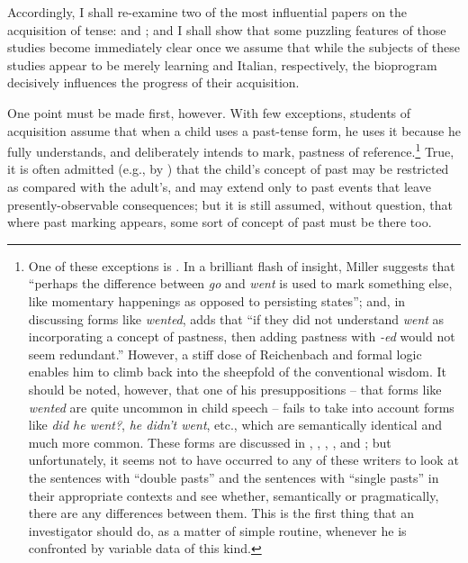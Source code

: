 \newpage Accordingly, I shall re-examine two of the most influential papers on the acquisition of tense: \citet{BrockartEtAl1973} and \citet{AntinucciEtAl1976}; and I shall show that some puzzling features of those studies become immediately clear once we assume that while the subjects of these studies appear to be merely learning  and Italian, respectively, the bioprogram decisively influences the progress of their acquisition.

One point must be made first, however. With few exceptions, students of acquisition assume that when a child uses a past-tense form, he uses it because he fully understands, and deliberately intends to mark, pastness of reference.\footnote{One of these exceptions is \citet{Miller1978}. In a brilliant flash of insight, Miller suggests that ``perhaps the difference between \textit{go} and \textit{went} is used to mark something else, like momentary happenings as opposed to persisting states''; and, in discussing forms like \textit{wented}, adds that ``if they did not understand \textit{went} as incorporating a concept of pastness, then adding pastness with \textit{-ed} would not seem redundant.'' However, a stiff dose of Reichenbach and formal logic enables him to climb back into the sheepfold of the conventional wisdom. It should be noted, however, that one of his presuppositions -- that forms like \textit{wented} are quite uncommon in child speech -- fails to take into account forms like \textit{did he went?}, \textit{he didn't went}, etc., which are semantically identical and much more common. These forms are discussed in \citet{Hurford1975}, \citet{Kuczaj1976}, \citet{Fay1978}, \citet{MaratsosEtAl1978}, and \citet{ErreichEtAl1980}; but unfortunately, it seems not to have occurred to any of these writers to look at the sentences with ``double pasts'' and the sentences with ``single pasts'' in their appropriate contexts and see whether, semantically or pragmatically, there are any differences between them. This is the first thing that an investigator should do, as a matter of simple routine, whenever he is confronted by variable data of this kind.\label{Fn5}} True, it is often admitted (e.g., by \citealt{AntinucciEtAl1976}) that the child's concept of past may be restricted as compared with the adult's, and may extend only to past events that leave presently-observable consequences; but it is still assumed, without question, that where past marking appears, some sort of concept of past must be there too.

